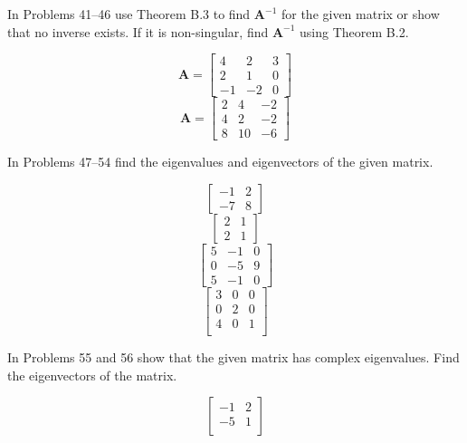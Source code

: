 \documentclass[chapter=2,section=1]{math252homework}
\begin{document}
In Problems 41--46 use Theorem B.3 to find $\mathbf{A}^{-1}$ for the given matrix or show that no inverse exists.
If it is non-singular, find $\mathbf{A}^{-1}$ using Theorem B.2.
\begin{problems}[start=41]
	\problem \[ \mathbf{A} = \left[ \begin{array}{ccc}
		4 & 2 & 3\\
		2 & 1 & 0\\
		-1 & -2 & 0
	\end{array} \right] \]						%
	\problem \[ \mathbf{A} = \left[ \begin{array}{ccc}
		2 & 4 & -2\\
		4 & 2 & -2\\
		8 & 10 & -6
	\end{array} \right] \]						%
\end{problems}

In Problems 47--54 find the eigenvalues and eigenvectors of the given matrix.
\begin{problems}[start=47]
	\problem \[ \left[ \begin{array}{cc}
		-1 & 2\\
		-7 & 8
	\end{array} \right] \]						%
	\problem \[ \left[ \begin{array}{cc}
		2 & 1\\
		2 & 1
	\end{array} \right] \]						%
	\setcounter{problemsi}{50}
	\problem \[ \left[ \begin{array}{ccc}
		5 & -1 & 0\\
		0 & -5 & 9\\
		5 & -1 & 0
	\end{array} \right] \]						%
	\problem \[ \left[ \begin{array}{ccc}
		3 & 0 & 0\\
		0 & 2 & 0\\
		4 & 0 & 1\\
	\end{array} \right] \]						%
\end{problems}

In Problems 55 and 56 show that the given matrix has complex eigenvalues.
Find the eigenvectors of the matrix.
\begin{problems}[start=55]
	\problem \[ \left[ \begin{array}{cc}
		-1 & 2\\
		-5 & 1\\
	\end{array} \right] \]						%
\end{problems}
\end{document}
